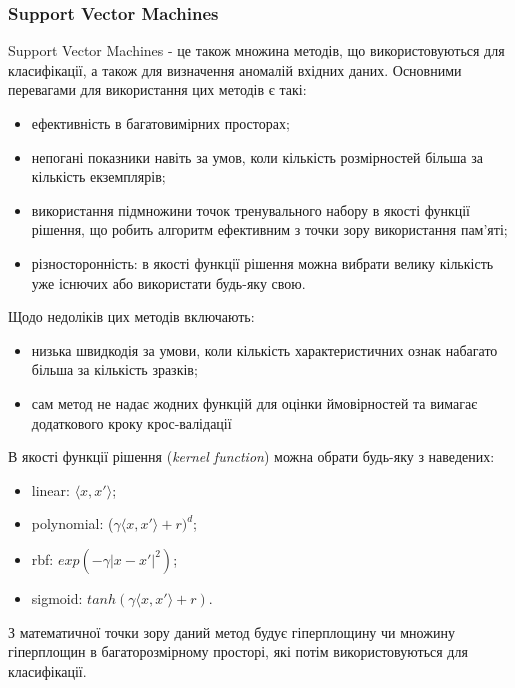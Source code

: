 \subsubsection{Support Vector Machines}
Support Vector Machines - це також множина методів, що використовуються для класифікації, а також для визначення аномалій вхідних даних. Основними перевагами для використання цих методів є такі:
\begin{itemize}  
	\item ефективність в багатовимірних просторах;
	\item непогані показники навіть за умов, коли кількість розмірностей більша за кількість екземплярів;
	\item використання підмножини точок тренувального набору в якості функції рішення, що робить алгоритм ефективним з точки зору використання пам'яті;
	\item різносторонність: в якості функції рішення можна вибрати велику кількість уже існючих або використати будь-яку свою.
\end{itemize}

Щодо недоліків цих методів включають:
\begin{itemize}  
	\item низька швидкодія за умови, коли кількість характеристичних ознак набагато більша за кількість зразків;
	\item сам метод не надає жодних функцій для оцінки ймовірностей та вимагає додаткового кроку крос-валідації
\end{itemize}

В якості функції рішення (\textit{kernel function}) можна обрати будь-яку з наведених:
\begin{itemize}  
	\item linear: $\langle x, x'\rangle$;
	\item polynomial: ($\gamma\langle x, x'\rangle + r)^d$;
	\item rbf: $exp(-\gamma|x-x'|^2)$;
	\item sigmoid: $tanh(\gamma\langle x, x'\rangle + r)$.
\end{itemize}

З математичної точки зору даний метод будує гіперплощину чи множину гіперплощин в багаторозмірному просторі, які потім використовуються для класифікації. 

